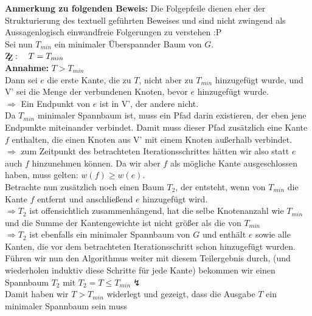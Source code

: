 \documentclass[10pt,a4paper]{article}
\newcommand{\zz}{\mathrm{Z\kern-.3em\raise-0.5ex\hbox{Z}}}
\begin{document}
\begin{itemize}
                    \textbf{Anmerkung zu folgenden Beweis: } 
                    Die Folgepfeile dienen eher der Strukturierung des textuell geführten Beweises
                    und sind nicht zwingend als Aussagenlogisch einwandfreie Folgerungen zu verstehen :P\\
                    
                    Sei nun $T_{min}$ ein minimaler Überspannder Baum von $G$.\\
                    $\zz: \quad T = T_{min}$\\
                    \textbf{Annahme:} $T > T_{min}$ \\
                    Dann sei $e$ die erste Kante, die zu $T$, nicht aber zu $T_{min}$ hinzugefügt wurde,
                    und V' sei die Menge der verbundenen Knoten, bevor $e$ hinzugefügt wurde.
                    \\ $\Rightarrow$ Ein Endpunkt von $e$ ist in V', der andere nicht.
                    \\ Da $T_{min}$ minimaler Spannbaum ist, muss ein Pfad darin existieren,
                    der eben jene Endpunkte miteinander verbindet. Damit muss dieser Pfad zusätzlich
                    eine Kante $f$ enthalten, die einen Knoten aus V' mit einem Knoten außerhalb
                    verbindet.
                    \\$\Rightarrow$ zum Zeitpunkt des betrachteten Iterationsschrittes
                    hätten wir also statt $e$ auch $f$ hinzunehmen können.
                    Da wir aber $f$ als mögliche Kante ausgeschlossen haben, muss gelten:
                    $w(f) \geq w(e)$. \\
                    Betrachte nun zusätzlich noch einen Baum $T_2$, der entsteht, wenn von
                    $T_{min}$ die Kante $f$ entfernt und anschließend $e$ hinzugefügt wird.
                    \\ $\Rightarrow T_2$ ist offensichtlich zusammenhängend, hat die selbe Knotenanzahl
                    wie $T_{min}$ und die Summe der Kantengewichte ist nicht größer als die von $T_{min}$
                    \\ $\Rightarrow T_2$ ist ebenfalls ein minimaler Spannbaum von $G$ und enthält
                    $e$ sowie alle Kanten, die vor dem betrachteten Iterationsschritt schon
                    hinzugefügt wurden. Führen wir nun den Algorithmus weiter mit diesem Teilergebnis
                    durch, (und wiederholen induktiv diese Schritte für jede Kante) bekommen wir einen
                    Spannbaum $T_2$ mit $T_2 = T \leq T_{min} \lightning$
                    \\
                    Damit haben wir $T > T_{min}$ widerlegt und gezeigt, dass die Ausgabe
                    $T$ ein minimaler Spannbaum sein muss
            
    \end{itemize}
\end{document}
